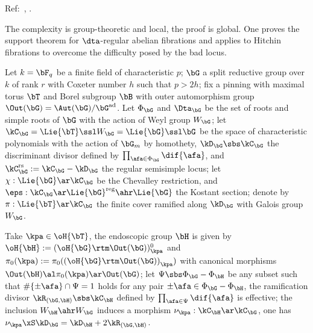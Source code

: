 \documentclass[a4paper, twoside]{article}
\begin{document}
\confighead{}{}{}



Ref:~\cite{Ngo2010Lemme}, \cite{Ngo2006Hitchin,Yun2009Thesis}.

The complexity is group-theoretic and local, the proof is global. One proves the support theorem for $\dta$-regular abelian fibrations and applies to Hitchin fibrations to overcome the difficulty posed by the bad locus.




\begin{stp}
	Let $k=\bF_{q}$ be a finite field of characteristic $p$; $\bG$ a split reductive group over $k$ of rank $r$ with Coxeter number $h$ such that $p>2h$; fix a pinning with maximal torus $\bT$ and Borel subgroup $\bB$ with outer automorphism group $\Out(\bG)=\Aut(\bG)/\bG^{\text{ad}}$. Let $\Phi_{\bG}$ and $\Dta_{\bG}$ be the set of roots and simple roots of $\bG$ with the action of Weyl group $W_{\bG}$; let $\kC_{\bG}=\Lie{\bT}\ssl W_{\bG}=\Lie{\bG}\ssl\bG$ be the space of characteristic polynomials with the action of $\bG_{m}$ by homothety, $\kD_{\bG}\sbs\kC_{\bG}$ the discriminant divisor defined by $\prod_{\afa\in\Phi_{\bG}}\dif{\afa}$, and $\kC_{\bG}^{\text{rs}}:=\kC_{\bG}-\kD_{\bG}$ the regular semisimple locus; let $\chi:\Lie{\bG}\ar\kC_{\bG}$ be the Chevalley restriction, and $\eps:\kC_{\bG}\ar\Lie{\bG}^{\text{reg}}\ahr\Lie{\bG}$ the Kostant section; denote by $\pi:\Lie{\bT}\ar\kC_{\bG}$ the finite cover ramified along $\kD_{\bG}$ with Galois group $W_{\bG}$.

	Take $\kpa\in\oH{\bT}$, the endoscopic group $\bH$ is given by $\oH{\bH}:={(\oH{\bG}\rtm\Out(\bG))}{}_{\kpa}^{0}$ and $\pi_{0}(\kpa):=\pi_{0}({(\oH{\bG}\rtm\Out(\bG))}_{\kpa})$ with canonical morphisms $\Out(\bH)\al\pi_{0}(\kpa)\ar\Out(\bG)$; let $\Psi\sbs\Phi_{\bG}-\Phi_{\bH}$ be any subset such that $\#\{\pm \afa\}\cap\Psi=1$ holds for any pair $\pm \afa\in\Phi_{\bG}-\Phi_{\bH}$, the ramification divisor $\kR_{(\bG,\bH)}\sbs\kC_{\bH}$ defined by $\prod_{\afa\in\Psi}\dif{\afa}$ is effective; the inclusion $W_{\bH}\ahr W_{\bG}$ induces a morphism $\nu_{\kpa}:\kC_{\bH}\ar\kC_{\bG}$, one has $\nu_{\kpa}\xS\kD_{\bG}=\kD_{\bH}+2\kR_{(\bG,\bH)}$.
\end{stp}
\end{document}
